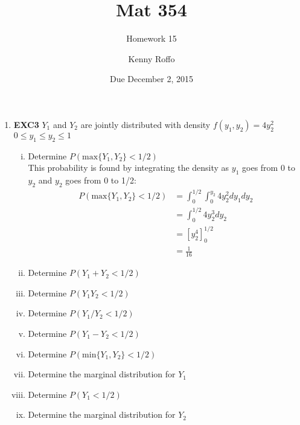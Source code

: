 \documentclass{scrartcl}
\title{Mat 354}
\subtitle{Homework 15}
\author{Kenny Roffo}
\date{Due December 2, 2015}
\begin{document}
\maketitle

\begin{enumerate}
  \item \textbf{EXC3}
    $Y_1$ and $Y_2$ are jointly distributed with density \hfill $f(y_1,y_2) = 4y_2^2$ \hspace{0.2in} $0\le y_1\le y_2\le1$\\

    \begin{enumerate}[i.]
      \item Determine $P(\text{max}\{Y_1,Y_2\}<1/2)$\\
        This probability is found by integrating the density as $y_1$ goes from 0 to $y_2$ and $y_2$ goes from 0 to 1/2:
        \begin{align*}
          P(\text{max}\{Y_1,Y_2\}<1/2) &= \int_0^{1/2}\int_0^{y_2}4y_2^2dy_1dy_2\\
          &= \int_0^{1/2}4y_2^3dy_2\\
          &= [y_2^4]_0^{1/2}\\
          &= \frac{1}{16}
        \end{align*}
        
      \item Determine $P(Y_1+Y_2<1/2)$\\
        
        
      \item Determine $P(Y_1Y_2<1/2)$\\
        
        
      \item Determine $P(Y_1/Y_2<1/2)$\\
        
        
      \item Determine $P(Y_1-Y_2<1/2)$\\
        
        
      \item Determine $P(\text{min}\{Y_1,Y_2\}<1/2)$\\
        
        
      \item Determine the marginal distribution for $Y_1$\\
        
        
      \item Determine $P(Y_1<1/2)$\\
        
        
      \item Determine the marginal distribution for $Y_2$
        
        
    \end{enumerate}
\end{enumerate}
\end{document}
